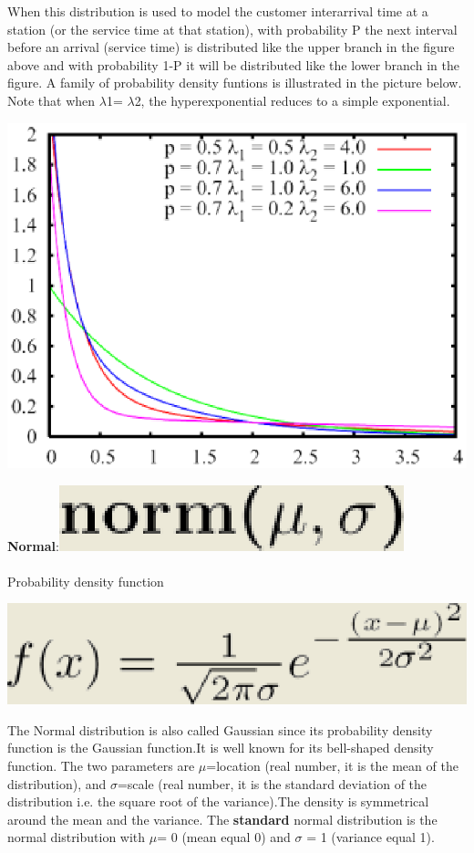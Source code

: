 When this distribution is used to model the customer interarrival time at a station (or the service time at that station), with  probability P the next interval before an arrival (service time) is  distributed like the upper branch in the figure above and with probability 1-P it will be distributed like the lower branch in the figure.
A family of probability density funtions is illustrated in the picture below. Note that when $\lambda$1= $\lambda$2, the hyperexponential reduces to a simple exponential.\\
\begin{center}
\includegraphics[scale=.5]{img/jsim/hyperexp_pdf.eps}
\end{center}
\textbf{Normal}:\includegraphics[scale=.5]{img/jsim/normal_f.eps}\\\\
Probability density function\\
\begin{center}
\includegraphics[scale=.5]{img/jsim/normal1.eps}
\end{center}
The Normal distribution is also called Gaussian since its probability density function is the Gaussian function.It is well known for its bell-shaped density function. The two parameters are $\mu$=location  (real number, it is the mean of the  distribution), and $\sigma$=scale (real number, it is the standard deviation of the distribution i.e. the square root of the variance).The density is symmetrical around the mean and the variance. The \textbf{standard} normal distribution is the normal distribution with $\mu$= 0 (mean equal 0) and $\sigma$ = 1 (variance equal 1).
